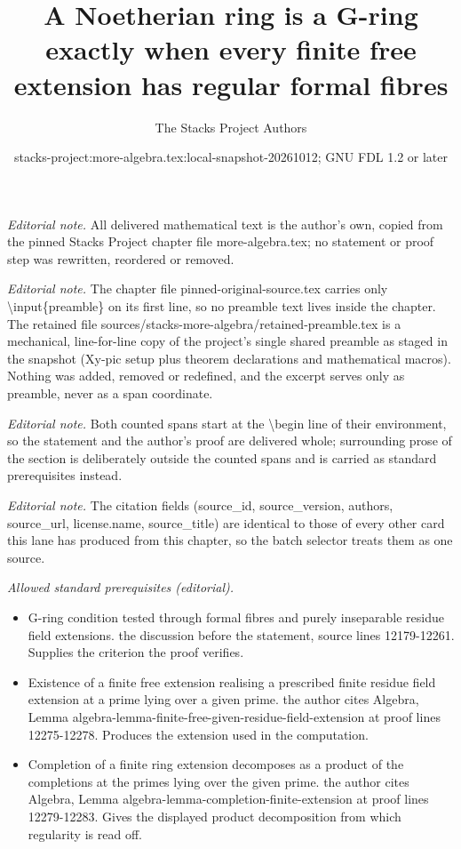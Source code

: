\documentclass[10pt,a4paper]{amsart}
\title{A Noetherian ring is a G-ring exactly when every finite free extension has regular formal fibres}
\author{The Stacks Project Authors}
\date{stacks-project:more-algebra.tex:local-snapshot-20261012; GNU FDL 1.2 or later}
\theoremstyle{plain}
\theoremstyle{definition}
\theoremstyle{remark}
\numberwithin{equation}{subsection}
\begin{document}
\maketitle
\setcounter{subsection}{1}
\noindent\textit{Editorial note.} All delivered mathematical text is the author's own, copied from the pinned Stacks Project chapter file more-algebra.tex; no statement or proof step was rewritten, reordered or removed.\par\medskip
\noindent\textit{Editorial note.} The chapter file pinned-original-source.tex carries only \textbackslash{}input\{preamble\} on its first line, so no preamble text lives inside the chapter. The retained file sources/stacks-more-algebra/retained-preamble.tex is a mechanical, line-for-line copy of the project's single shared preamble as staged in the snapshot (Xy-pic setup plus theorem declarations and mathematical macros). Nothing was added, removed or redefined, and the excerpt serves only as preamble, never as a span coordinate.\par\medskip
\noindent\textit{Editorial note.} Both counted spans start at the \textbackslash{}begin line of their environment, so the statement and the author's proof are delivered whole; surrounding prose of the section is deliberately outside the counted spans and is carried as standard prerequisites instead.\par\medskip
\noindent\textit{Editorial note.} The citation fields (source\_id, source\_version, authors, source\_url, license.name, source\_title) are identical to those of every other card this lane has produced from this chapter, so the batch selector treats them as one source.\par\medskip
\noindent\textit{Allowed standard prerequisites (editorial).}\begin{itemize}
\item G-ring condition tested through formal fibres and purely inseparable residue field extensions. the discussion before the statement, source lines 12179-12261. Supplies the criterion the proof verifies.
\item Existence of a finite free extension realising a prescribed finite residue field extension at a prime lying over a given prime. the author cites Algebra, Lemma algebra-lemma-finite-free-given-residue-field-extension at proof lines 12275-12278. Produces the extension used in the computation.
\item Completion of a finite ring extension decomposes as a product of the completions at the primes lying over the given prime. the author cites Algebra, Lemma algebra-lemma-completion-finite-extension at proof lines 12279-12283. Gives the displayed product decomposition from which regularity is read off.
\end{itemize}\medskip
\end{document}
